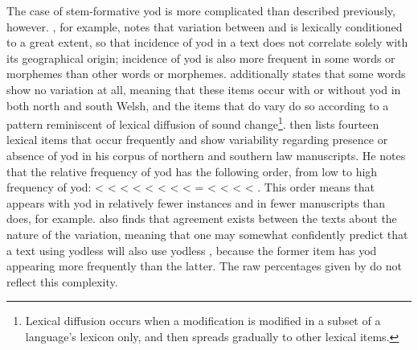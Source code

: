 The case of stem-formative yod is more complicated than described previously, however. \Textcite{Rus_Celtic90}, for example, notes that variation between  and  is  lexically conditioned to a great extent, so that incidence of yod in a text does not correlate solely with its geographical origin; incidence of yod is also more frequent in some words or morphemes than other words or morphemes. \Textcite[106]{Wil_Lexical05}  additionally states  that some words show no variation at all, meaning that these items occur with or without yod in both north and south Welsh, and the items that do vary do so according to a pattern reminiscent of lexical diffusion of sound change\footnote{Lexical diffusion occurs when a modification is modified in a subset of a language's lexicon only, and then spreads gradually to other lexical items.}. \Textcite[116]{Wil_Lexical05} then lists fourteen lexical items that occur frequently and show variability regarding presence or absence of yod in his corpus of northern and southern law manuscripts. He notes that the relative frequency of yod has the following order, from low  to high frequency of yod:  <  <  <  <  <  <  <  <  =  <  <  <  < . This order means  that  appears with yod in relatively fewer instances and in fewer manuscripts than  does, for example. \Textcite[117]{Wil_Lexical05} also finds that agreement exists between the texts about the nature of the variation, meaning that one may somewhat confidently predict that a text using yodless  will also use yodless , because the former item has yod appearing more frequently than the latter. The raw percentages given by \textcite{Tho_Middle93} do not reflect this complexity.

